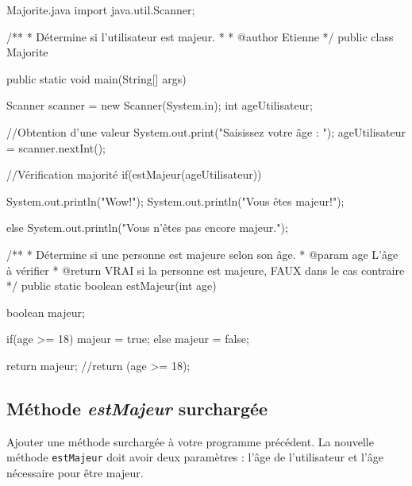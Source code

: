 \documentclass[12pt]{article}
\begin{document}
\begin{MyTCB}{Majorite.java}
import java.util.Scanner;

/**
 * Détermine si l'utilisateur est majeur.
 * 
 * @author Etienne
 */
public class Majorite {

	public static void main(String[] args) {
		
		Scanner scanner = new Scanner(System.in);
		int ageUtilisateur;
		
		//Obtention d'une valeur
		System.out.print("Saisissez votre âge : ");
		ageUtilisateur = scanner.nextInt();
		
		//Vérification majorité
		if(estMajeur(ageUtilisateur)) {
			
			System.out.println("Wow!");
			System.out.println("Vous êtes majeur!");
			
		}
		else {
			System.out.println("Vous n'êtes pas encore majeur.");
		}
		
	}
	
	
	/**
	 * Détermine si une personne est majeure selon son âge.
	 * @param age L'âge à vérifier
	 * @return VRAI si la personne est majeure, FAUX dans le cas contraire
	 */
	public static boolean estMajeur(int age) {
		
		boolean majeur;
		
		if(age >= 18)
			majeur = true;
		else
			majeur = false;
		
		return majeur; //return (age >= 18);
	}
	
}
\end{MyTCB}

%
%
%
%
%

\subsection{Méthode \emph{estMajeur} surchargée}

Ajouter une méthode surchargée à votre programme précédent. La nouvelle méthode \verb|estMajeur| doit avoir deux paramètres : l'âge de l'utilisateur et l'âge nécessaire pour être majeur.
\end{document}
